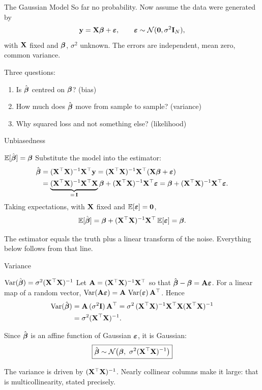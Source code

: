 \documentclass[11pt,aspectratio=169]{beamer}
\begin{document}
\begin{frame}{The Gaussian Model}
So far no probability. Now assume the data were generated by
\[
\vy=\vX\vbeta+\veps,\qquad \veps\sim\Ncal(\vzero,\sigma^2\vI_N),
\]
with $\vX$ fixed and $\vbeta$, $\sigma^2$ unknown. The errors are independent, mean zero, common variance.
\vspace{6pt}

Three questions:
\begin{enumerate}
  \item Is $\hat\vbeta$ centred on $\vbeta$? \hfill (bias)
  \item How much does $\hat\vbeta$ move from sample to sample? \hfill (variance)
  \item Why squared loss and not something else? \hfill (likelihood)
\end{enumerate}
\end{frame}

\begin{frame}{Unbiasedness}
\begin{derivation}{$\E[\hat\vbeta]=\vbeta$}
Substitute the model into the estimator:
\begin{align*}
\hat\vbeta&=(\vX\T\vX)\inv\vX\T\vy=(\vX\T\vX)\inv\vX\T(\vX\vbeta+\veps)\\
&=\underbrace{(\vX\T\vX)\inv\vX\T\vX}_{=\,\vI}\vbeta+(\vX\T\vX)\inv\vX\T\veps
=\vbeta+(\vX\T\vX)\inv\vX\T\veps .
\end{align*}
Taking expectations, with $\vX$ fixed and $\E[\veps]=\vzero$,
\[
\E[\hat\vbeta]=\vbeta+(\vX\T\vX)\inv\vX\T\,\E[\veps]=\vbeta .
\]
\end{derivation}
The estimator equals the truth plus a linear transform of the noise. Everything below follows from that line.
\end{frame}

\begin{frame}{Variance}
\begin{derivation}{$\Var(\hat\vbeta)=\sigma^2(\vX\T\vX)\inv$}
Let $\vA=(\vX\T\vX)\inv\vX\T$ so that $\hat\vbeta-\vbeta=\vA\veps$. For a linear map of a random vector,
$\Var(\vA\veps)=\vA\,\Var(\veps)\,\vA\T$. Hence
\begin{align*}
\Var(\hat\vbeta)&=\vA\,(\sigma^2\vI)\,\vA\T=\sigma^2\,(\vX\T\vX)\inv\vX\T\vX(\vX\T\vX)\inv\\
&=\sigma^2(\vX\T\vX)\inv .
\end{align*}
\end{derivation}
Since $\hat\vbeta$ is an affine function of Gaussian $\veps$, it is Gaussian:
\[
\boxed{\hat\vbeta\sim\Ncal\bigl(\vbeta,\ \sigma^2(\vX\T\vX)\inv\bigr)}
\]
\begin{keypoint}
The variance is driven by $(\vX\T\vX)\inv$. Nearly collinear columns make it large: that is
multicollinearity, stated precisely.
\end{keypoint}
\end{frame}
\end{document}
